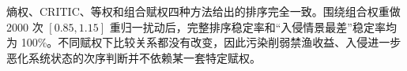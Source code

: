 熵权、CRITIC、等权和组合赋权四种方法给出的排序完全一致。围绕组合权重做 2000 次 $[0.85,1.15]$ 重归一扰动后，完整排序稳定率和“入侵情景最差”稳定率均为 100\%。不同赋权下比较关系都没有改变，因此污染削弱禁渔收益、入侵进一步恶化系统状态的次序判断并不依赖某一套特定赋权。
